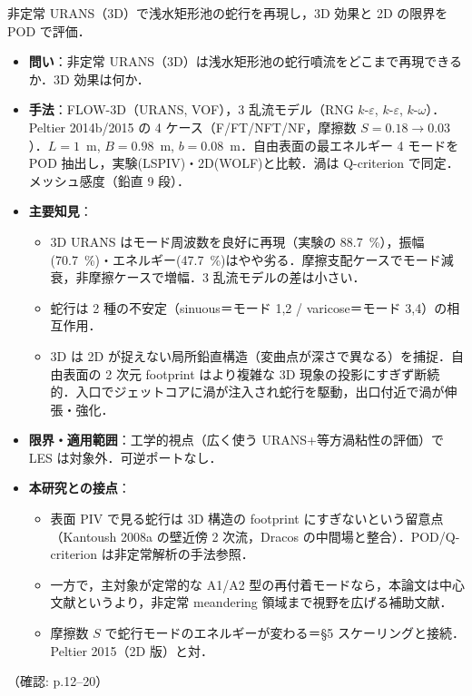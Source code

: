 \documentclass[11pt]{jsarticle}
\newcommand{\litref}[1]{{\large\bfseries\color{citecolor}#1}}
\begin{document}
\noindent\litref{Valero et al. (2022)}\quad 非定常 URANS（3D）で浅水矩形池の蛇行を再現し，3D 効果と 2D の限界を POD で評価．
\begin{itemize}
  \item \textbf{問い}：非定常 URANS（3D）は浅水矩形池の蛇行噴流をどこまで再現できるか．3D 効果は何か．
  \item \textbf{手法}：FLOW-3D（URANS, VOF），3 乱流モデル（RNG $k$-$\varepsilon$, $k$-$\varepsilon$, $k$-$\omega$）．Peltier 2014b/2015 の 4 ケース（F/FT/NFT/NF，摩擦数 $S = 0.18 \to 0.03$）．$L=1$~m, $B=0.98$~m, $b=0.08$~m．自由表面の最エネルギー 4 モードを POD 抽出し，実験(LSPIV)・2D(WOLF)と比較．渦は Q-criterion で同定．メッシュ感度（鉛直 9 段）．
  \item \textbf{主要知見}：
  \begin{itemize}
    \item 3D URANS はモード周波数を良好に再現（実験の 88.7~\%），振幅(70.7~\%)・エネルギー(47.7~\%)はやや劣る．摩擦支配ケースでモード減衰，非摩擦ケースで増幅．3 乱流モデルの差は小さい．
    \item 蛇行は 2 種の不安定（sinuous＝モード 1,2 / varicose＝モード 3,4）の相互作用．
    \item 3D は 2D が捉えない局所鉛直構造（変曲点が深さで異なる）を捕捉．自由表面の 2 次元 footprint はより複雑な 3D 現象の投影にすぎず断続的．入口でジェットコアに渦が注入され蛇行を駆動，出口付近で渦が伸張・強化．
  \end{itemize}
  \item \textbf{限界・適用範囲}：工学的視点（広く使う URANS+等方渦粘性の評価）で LES は対象外．可逆ポートなし．
  \item \textbf{本研究との接点}：
  \begin{itemize}
    \item 表面 PIV で見る蛇行は 3D 構造の footprint にすぎないという留意点（Kantoush 2008a の壁近傍 2 次流，Dracos の中間場と整合）．POD/Q-criterion は非定常解析の手法参照．
    \item 一方で，主対象が定常的な A1/A2 型の再付着モードなら，本論文は中心文献というより，非定常 meandering 領域まで視野を広げる補助文献．
    \item 摩擦数 $S$ で蛇行モードのエネルギーが変わる＝§5 スケーリングと接続．Peltier 2015（2D 版）と対．
  \end{itemize}
\end{itemize}
\noindent（確認: p.12--20）
\end{document}
